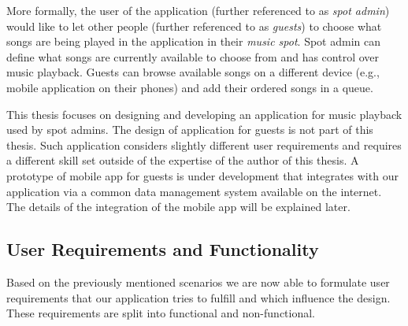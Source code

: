 \par
More formally, the user of the application (further referenced to as \textit{spot admin}) would like to let other people (further referenced to as \textit{guests}) to choose what songs are being played in the application in their \textit{music spot}. Spot admin can define what songs are currently available to choose from and has control over music playback. Guests can browse available songs on a different device (e.g., mobile application on their phones) and add their ordered songs in a queue.
\par
This thesis focuses on designing and developing an application for music playback used by spot admins. The design of application for guests is not part of this thesis. Such application considers slightly different user requirements and requires a different skill set outside of the expertise of the author of this thesis. A prototype of mobile app for guests is under development that integrates with our application via a common data management system available on the internet. The details of the integration of the mobile app will be explained later.

\subsection{User Requirements and Functionality}

Based on the previously mentioned scenarios we are now able to formulate user requirements that our application tries to fulfill and which influence the design. These requirements are split into functional and non-functional.

